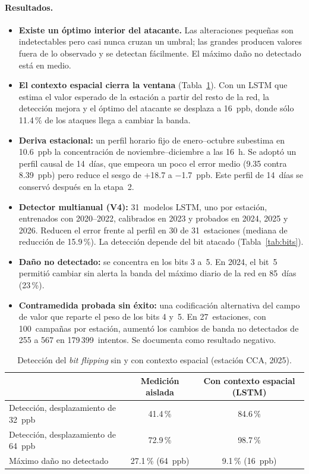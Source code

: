 \documentclass[11pt, letterpaper]{article}
\begin{document}
\paragraph{Resultados.}
\begin{itemize}
  \item \textbf{Existe un óptimo interior del atacante.} Las alteraciones pequeñas son
    indetectables pero casi nunca cruzan un umbral; las grandes producen valores fuera de
    lo observado y se detectan fácilmente. El máximo daño no detectado está en medio.
  \item \textbf{El contexto espacial cierra la ventana} (Tabla~\ref{tab:capa1}). Con un
    LSTM que estima el valor esperado de la estación a partir del resto de la red, la
    detección mejora y el óptimo del atacante se desplaza a 16~ppb, donde sólo 11.4\,\%
    de los ataques llega a cambiar la banda.
  \item \textbf{Deriva estacional:} un perfil horario fijo de enero--octubre subestima en
    10.6~ppb la concentración de noviembre--diciembre a las 16~h. Se adoptó un perfil
    causal de 14~días, que empeora un poco el error medio (9.35 contra 8.39~ppb) pero
    reduce el sesgo de +18.7 a $-$1.7~ppb. Este perfil de 14~días se conservó después en
    la etapa~2.
  \item \textbf{Detector multianual (V4):} 31~modelos LSTM, uno por estación, entrenados
    con 2020--2022, calibrados en 2023 y probados en 2024, 2025 y 2026. Reducen el error
    frente al perfil en 30 de 31~estaciones (mediana de reducción de 15.9\,\%). La
    detección depende del bit atacado (Tabla~\ref{tab:bits}).
  \item \textbf{Daño no detectado:} se concentra en los bits 3 a~5. En 2024, el bit~5
    permitió cambiar sin alerta la banda del máximo diario de la red en 85~días (23\,\%).
  \item \textbf{Contramedida probada sin éxito:} una codificación alternativa del campo de
    valor que reparte el peso de los bits 4 y~5. En 27~estaciones, con 100~campañas por
    estación, aumentó los cambios de banda no detectados de 255 a 567 en 179\,399~intentos.
    Se documenta como resultado negativo.
\end{itemize}

\begin{table}[H]
  \centering
  \small
  \caption{Detección del \emph{bit flipping} sin y con contexto espacial (estación CCA,
    2025).}
  \label{tab:capa1}
  \begin{tabular}{@{}lcc@{}}
    \toprule
    & \textbf{Medición aislada} & \textbf{Con contexto espacial (LSTM)} \\
    \midrule
    Detección, desplazamiento de 32~ppb & 41.4\,\% & 84.6\,\% \\
    Detección, desplazamiento de 64~ppb & 72.9\,\% & 98.7\,\% \\
    Máximo daño no detectado & 27.1\,\% (64~ppb) & 9.1\,\% (16~ppb) \\
    \bottomrule
  \end{tabular}
\end{table}
\end{document}
